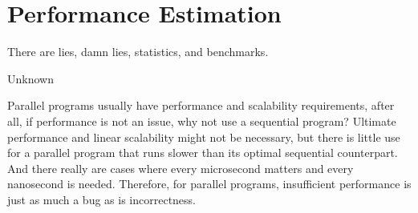 \section{Performance Estimation}
\label{sec:debugging:Performance Estimation}
%
\epigraph{There are lies, damn lies, statistics, and benchmarks.}
	 {Unknown}

Parallel programs usually have performance and scalability requirements,
after all, if performance is not an issue, why not use a sequential
program?
Ultimate performance and linear scalability might not be necessary, but
there is little use for a parallel program that runs slower than its
optimal sequential counterpart.
And there really are cases where every microsecond matters and every
nanosecond is needed.
Therefore, for parallel programs, insufficient performance is just as
much a bug as is incorrectness.

